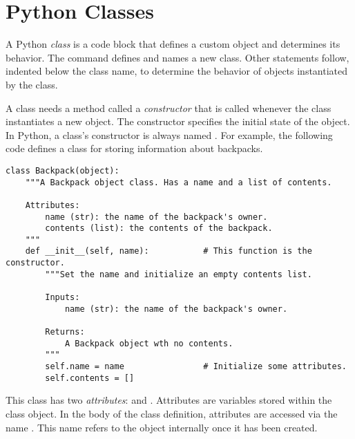 \label{lab:OOP}


\section*{Python Classes}

A Python \emph{class} is a code block that defines a custom object and determines its behavior.
The  command defines and names a new class.
Other statements follow, indented below the class name, to determine the behavior of objects instantiated by the class.

A class needs a method called a \emph{constructor} that is called whenever the class instantiates a new object.
The constructor specifies the initial state of the object.
In Python, a class's constructor is always named .
For example, the following code defines a class for storing information about backpacks.

\begin{lstlisting}
class Backpack(object):
    """A Backpack object class. Has a name and a list of contents.
    
    Attributes:
        name (str): the name of the backpack's owner.
        contents (list): the contents of the backpack.
    """
    def __init__(self, name):           # This function is the constructor.
        """Set the name and initialize an empty contents list.
        
        Inputs:
            name (str): the name of the backpack's owner.
        
        Returns:
            A Backpack object wth no contents.
        """ 
        self.name = name                # Initialize some attributes.
        self.contents = []
\end{lstlisting}

This  class has two \emph{attributes}:  and .
Attributes are variables stored within the class object.
In the body of the class definition, attributes are accessed via the name .
This name refers to the object internally once it has been created.

